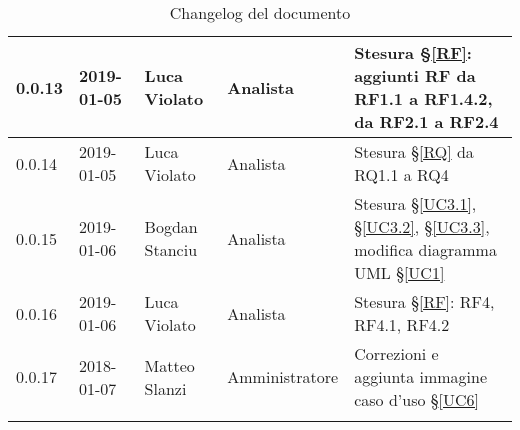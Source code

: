 \begin{center}
\begin{longtable}[c]{|m{}|m{}|m{}|m{}|p{}|}
\hline
0.0.13 & 2019-01-05 & Luca Violato & Analista & Stesura §\ref{RF}: aggiunti RF da RF1.1 a RF1.4.2, da RF2.1 a RF2.4\\
\hline
\rowcolor{grigio}0.0.14 & 2019-01-05 & Luca Violato & Analista & Stesura §\ref{RQ} da RQ1.1 a RQ4\\
\hline
0.0.15 & 2019-01-06 & Bogdan Stanciu & Analista & Stesura §\ref{UC3.1}, §\ref{UC3.2}, §\ref{UC3.3}, modifica diagramma UML §\ref{UC1} \\
\hline
\rowcolor{grigio}0.0.16 & 2019-01-06 & Luca Violato & Analista & Stesura §\ref{RF}: RF4, RF4.1, RF4.2\\
\hline
0.0.17 & 2018-01-07 & Matteo Slanzi & Amministratore & Correzioni e aggiunta immagine caso d'uso §\ref{UC6}\\
\hline
\caption{Changelog del documento}
\end{longtable}
\end{center}